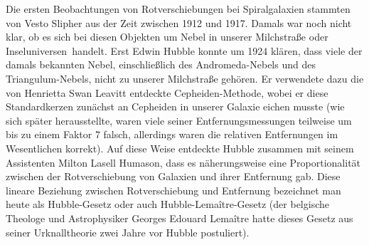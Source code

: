 Die ersten Beobachtungen von Rotverschiebungen bei Spiralgalaxien stammten von 
Vesto Slipher aus der Zeit zwischen 1912 und 1917. 
Damals war noch nicht klar, ob es sich bei diesen Objekten um Nebel in unserer Milchstra\ss e oder
\glqq Inseluniversen\grqq\ handelt.
Erst Edwin Hubble 
konnte um 1924 kl\"aren, dass viele der damals bekannten Nebel, einschlie\ss lich
des Andromeda-Nebels und des Triangulum-Nebels, nicht zu unserer Milchstra\ss e geh\"oren. Er verwendete
dazu die von Henrietta Swan Leavitt entdeckte Cepheiden-Methode, wobei er diese Standardkerzen zun\"achst
an Cepheiden in unserer Galaxie eichen musste (wie sich sp\"ater herausstellte, waren viele seiner
Entfernungsmessungen teilweise um bis zu einem Faktor 7 falsch, allerdings waren die relativen Entfernungen
im Wesentlichen korrekt).  Auf diese Weise entdeckte Hubble zusammen mit seinem Assistenten 
Milton Lasell Humason, dass es n\"aherungsweise eine Proportionalit\"at zwischen der Rotverschiebung
von Galaxien und ihrer Entfernung gab. Diese lineare Beziehung zwischen Rotverschiebung und
Entfernung bezeichnet man heute als Hubble-Gesetz
oder auch Hubble-Lema\^{i}tre-Gesetz (der belgische Theologe und Astrophysiker 
Georges Edouard Lema\^{i}tre
hatte dieses Gesetz aus seiner Urknalltheorie zwei Jahre vor Hubble postuliert). 

